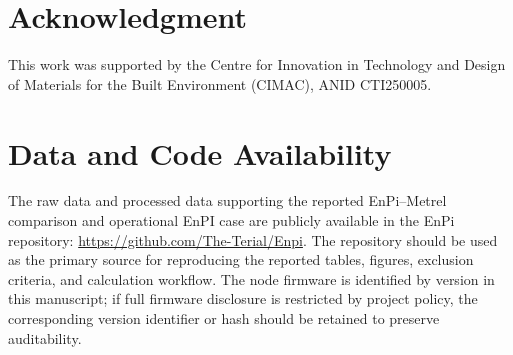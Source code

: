 \documentclass{ieeeaccess}
\begin{document}
\section*{Acknowledgment}
This work was supported by the Centre for Innovation in Technology and Design of Materials for the Built Environment (CIMAC), ANID CTI250005.

\section*{Data and Code Availability}

The raw data and processed data supporting the reported EnPi--Metrel comparison and operational EnPI case are publicly available in the EnPi repository: \url{https://github.com/The-Terial/Enpi}. The repository should be used as the primary source for reproducing the reported tables, figures, exclusion criteria, and calculation workflow. The node firmware is identified by version in this manuscript; if full firmware disclosure is restricted by project policy, the corresponding version identifier or hash should be retained to preserve auditability.
\end{document}
